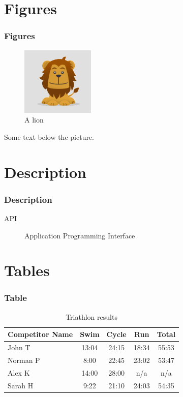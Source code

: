 \documentclass{beamer}
\begin{document}
\section{Figures}

\begin{frame}
\frametitle{Figures}
\begin{figure}
    \centering
    \includegraphics[scale=0.5]{lion.png}
    \caption{A lion}
\end{figure}

Some text below the picture.

\end{frame}

\section{Description}

\begin{frame}
\frametitle{Description}
\begin{description}
    \item[API] Application Programming Interface
\end{description}
\end{frame}

\section{Tables}

\begin{frame}
\frametitle{Table}
\begin{table}
    \begin{tabular}{l | c | c | c | c }
    Competitor Name & Swim & Cycle & Run & Total \\
    \hline \hline
    John T & 13:04 & 24:15 & 18:34 & 55:53 \\ 
    Norman P & 8:00 & 22:45 & 23:02 & 53:47\\
    Alex K & 14:00 & 28:00 & n/a & n/a\\
    Sarah H & 9:22 & 21:10 & 24:03 & 54:35 
    \end{tabular}
    \caption{Triathlon results}
\end{table}
\end{frame}
\end{document}
